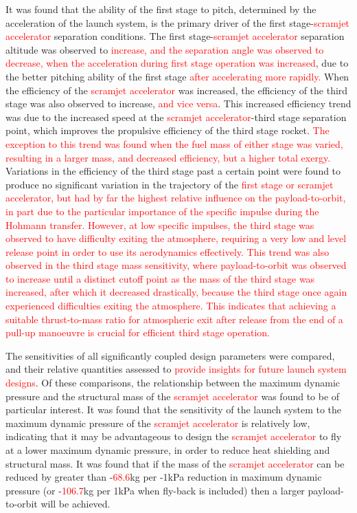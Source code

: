 It was found that the ability of the first stage to pitch, determined by the acceleration of the launch system, is the primary driver of the first stage-\textcolor{red}{scramjet accelerator} separation conditions. The first stage-\textcolor{red}{scramjet accelerator} separation altitude was observed to \textcolor{red}{increase, and the separation angle was observed to decrease, when the acceleration during first stage operation was increased}, due to the better pitching ability of the first stage \textcolor{red}{after accelerating more rapidly.}
When the efficiency of the \textcolor{red}{scramjet accelerator} was increased, the efficiency of the third stage was also observed to increase, \textcolor{red}{and vice versa}. This increased efficiency trend was due to the increased speed at the \textcolor{red}{scramjet accelerator}-third stage separation point, which improves the propulsive efficiency of the third stage rocket. \textcolor{red}{The exception to this trend was found when the fuel mass of either stage was varied, resulting in a larger mass, and decreased efficiency, but a higher total exergy.}
Variations in the efficiency of the third stage past a certain point were found to produce no significant variation in the trajectory of the \textcolor{red}{first stage or scramjet accelerator, but had by far the highest relative influence on the payload-to-orbit, in part due to the particular importance of the specific impulse during the Hohmann transfer. However, at low specific impulses, the third stage was observed to have difficulty exiting the atmosphere, requiring a very low and level release point in order to use its aerodynamics effectively. This trend was also observed in the third stage mass sensitivity, where payload-to-orbit was observed to increase until a distinct cutoff point as the mass of the third stage was increased, after which it decreased drastically, because the third stage once again experienced difficulties exiting the atmosphere. This indicates that achieving a suitable thrust-to-mass ratio for atmospheric exit after release from the end of a pull-up manoeuvre is crucial for efficient third stage operation. } 

The sensitivities of all significantly coupled design parameters were compared, and their relative quantities assessed to \textcolor{red}{provide insights for future launch system designs}. Of these comparisons, the relationship between the maximum dynamic pressure and the structural mass of the \textcolor{red}{scramjet accelerator} was found to be of particular interest. 
It was found that the sensitivity of the launch system to the maximum dynamic pressure of the \textcolor{red}{scramjet accelerator} is relatively low, indicating that it may be advantageous to design the \textcolor{red}{scramjet accelerator} to fly at a lower maximum dynamic pressure, in order to reduce heat shielding and structural mass. It was found that if the mass of the \textcolor{red}{scramjet accelerator} can be reduced by greater than -\textcolor{red}{68.6}kg per -1kPa reduction in maximum dynamic pressure (or -\textcolor{red}{106.7}kg per 1kPa when fly-back is included) then a larger payload-to-orbit will be achieved.
 

